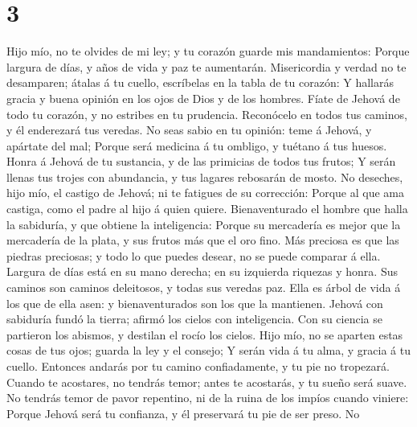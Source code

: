 \hypertarget{section-2}{%
\section{3}\label{section-2}}

 Hijo mío, no te olvides de mi ley; y tu corazón guarde
mis mandamientos:  Porque largura de días, y años de vida
y paz te aumentarán.  Misericordia y verdad no te
desamparen; átalas á tu cuello, escríbelas en la tabla de tu corazón:
 Y hallarás gracia y buena opinión en los ojos de Dios y
de los hombres.  Fíate de Jehová de todo tu corazón, y no
estribes en tu prudencia.  Reconócelo en todos tus
caminos, y él enderezará tus veredas.  No seas sabio en tu
opinión: teme á Jehová, y apártate del mal;  Porque será
medicina á tu ombligo, y tuétano á tus huesos.  Honra á
Jehová de tu sustancia, y de las primicias de todos tus frutos;
 Y serán llenas tus trojes con abundancia, y tus lagares
rebosarán de mosto.  No deseches, hijo mío, el castigo de
Jehová; ni te fatigues de su corrección:  Porque al que
ama castiga, como el padre al hijo á quien quiere. 
Bienaventurado el hombre que halla la sabiduría, y que obtiene la
inteligencia:  Porque su mercadería es mejor que la
mercadería de la plata, y sus frutos más que el oro fino.
 Más preciosa es que las piedras preciosas; y todo lo que
puedes desear, no se puede comparar á ella.  Largura de
días está en su mano derecha; en su izquierda riquezas y honra.
 Sus caminos son caminos deleitosos, y todas sus veredas
paz.  Ella es árbol de vida á los que de ella asen: y
bienaventurados son los que la mantienen.  Jehová con
sabiduría fundó la tierra; afirmó los cielos con inteligencia.
 Con su ciencia se partieron los abismos, y destilan el
rocío los cielos.  Hijo mío, no se aparten estas cosas de
tus ojos; guarda la ley y el consejo;  Y serán vida á tu
alma, y gracia á tu cuello.  Entonces andarás por tu
camino confiadamente, y tu pie no tropezará.  Cuando te
acostares, no tendrás temor; antes te acostarás, y tu sueño será suave.
 No tendrás temor de pavor repentino, ni de la ruina de
los impíos cuando viniere:  Porque Jehová será tu
confianza, y él preservará tu pie de ser preso.  No
